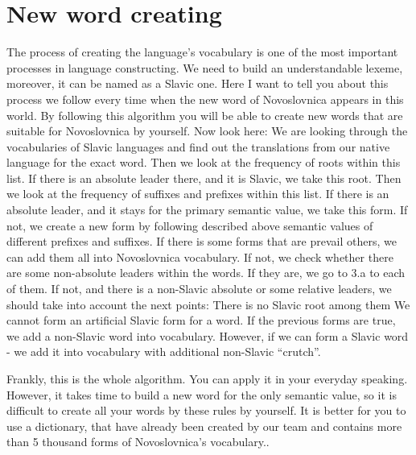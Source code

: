 \section{New word creating}

The process of creating the language’s vocabulary is one of the most important processes in language constructing. We need to build an understandable lexeme, moreover, it can be named as a Slavic one. Here I want to tell you about this process we follow every time when the new word of Novoslovnica appears in this world. By following this algorithm you will be able to create new words that are suitable for Novoslovnica by yourself. Now look here:
We are looking through the vocabularies of Slavic languages and find out the translations from our native language for the exact word.
Then we look at the frequency of roots within this list.
If there is an absolute leader there, and it is Slavic, we take this root.
Then we look at the frequency of suffixes and prefixes within this list.
If there is an absolute leader, and it stays for the primary semantic value, we take this form.
If not, we create a new form by following described above semantic values of different prefixes and suffixes.
If there is some forms that are prevail others, we can add them all into Novoslovnica vocabulary.
If not, we check whether there are some non-absolute leaders within the words. If they are, we go to 3.a to each of them.
If not, and there is a non-Slavic absolute or some relative leaders, we should take into account the next points:
There is no Slavic root among them
We cannot form an artificial Slavic form for a word.
If the previous forms are true, we add a non-Slavic word into vocabulary. However, if we can form a Slavic word - we add it into vocabulary with additional non-Slavic “crutch”. 

Frankly, this is the whole algorithm. You can apply it in your everyday speaking. However, it takes time to build a new word for the only semantic value, so it is difficult to create all your words by these rules by yourself. It is better for you to use a dictionary, that have already been created by our team and contains more than 5 thousand forms of Novoslovnica’s vocabulary.. 